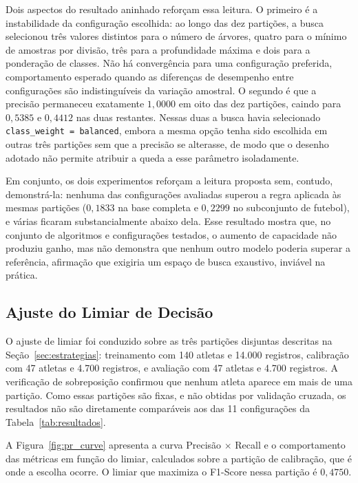 Dois aspectos do resultado aninhado reforçam essa leitura. O primeiro é a instabilidade da configuração escolhida: ao longo das dez partições, a busca selecionou três valores distintos para o número de árvores, quatro para o mínimo de amostras por divisão, três para a profundidade máxima e dois para a ponderação de classes. Não há convergência para uma configuração preferida, comportamento esperado quando as diferenças de desempenho entre configurações são indistinguíveis da variação amostral. O segundo é que a precisão permaneceu exatamente $1{,}0000$ em oito das dez partições, caindo para $0{,}5385$ e $0{,}4412$ nas duas restantes. Nessas duas a busca havia selecionado \texttt{class\_weight = balanced}, embora a mesma opção tenha sido escolhida em outras três partições sem que a precisão se alterasse, de modo que o desenho adotado não permite atribuir a queda a esse parâmetro isoladamente.

Em conjunto, os dois experimentos reforçam a leitura proposta sem, contudo, demonstrá-la: nenhuma das configurações avaliadas superou a regra aplicada às mesmas partições ($0{,}1833$ na base completa e $0{,}2299$ no subconjunto de futebol), e várias ficaram substancialmente abaixo dela. Esse resultado mostra que, no conjunto de algoritmos e configurações testados, o aumento de capacidade não produziu ganho, mas não demonstra que nenhum outro modelo poderia superar a referência, afirmação que exigiria um espaço de busca exaustivo, inviável na prática.

\subsection{Ajuste do Limiar de Decisão}

O ajuste de limiar foi conduzido sobre as três partições disjuntas descritas na Seção~\ref{sec:estrategias}: treinamento com 140 atletas e 14.000 registros, calibração com 47 atletas e 4.700 registros, e avaliação com 47 atletas e 4.700 registros. A verificação de sobreposição confirmou que nenhum atleta aparece em mais de uma partição. Como essas partições são fixas, e não obtidas por validação cruzada, os resultados não são diretamente comparáveis aos das 11 configurações da Tabela~\ref{tab:resultados}.

A Figura~\ref{fig:pr_curve} apresenta a curva Precisão $\times$ Recall e o comportamento das métricas em função do limiar, calculados sobre a partição de calibração, que é onde a escolha ocorre. O limiar que maximiza o F1-Score nessa partição é $0{,}4750$.

